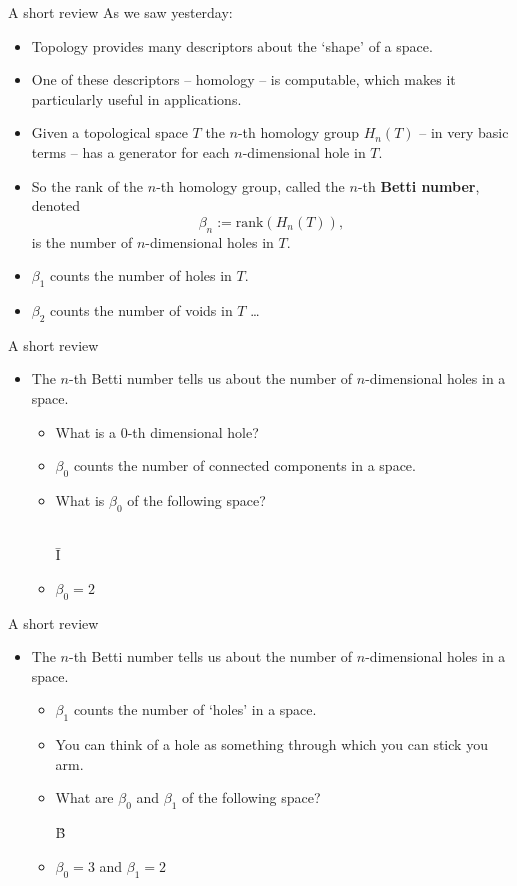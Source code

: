 \begin{frame}{A short review}
As we saw yesterday:
\begin{itemize}
\item<2-> Topology provides many descriptors about the `shape' of a space.
\item<3-> One of these descriptors -- homology -- is computable, which makes it particularly useful in applications.
\item<4-> Given a topological space $T$ the $n$-th homology group $H_n(T)$ -- in very basic terms -- has a generator for each $n$-dimensional hole in $T$. 
\item<5-> So the rank of the $n$-th homology group, called the $n$-th \textbf{Betti number}, denoted
	\[
	\beta_n := \textrm{rank}(H_n(T)),
	\]
is the number of $n$-dimensional holes in $T$.
\item<6-> $\beta_1$ counts the number of holes in $T$.
\item<7-> $\beta_2$ counts the number of voids in $T$ \ldots
\end{itemize}
\end{frame}
\begin{frame}{A short review}
\begin{itemize}
\item The $n$-th Betti number tells us about the number of $n$-dimensional holes in a space.
	\begin{itemize}
	\item<1-> What is a $0$-th dimensional hole?
	\item<2-> $\beta_0$ counts the number of connected components in a space.
	\item<3-> What is $\beta_0$ of the following space?\\
	\
	\begin{center}
	{\fontsize{50pt}{1pt}\selectfont \={I}}
	\end{center}
	\item<4-> $\beta_0 = 2$
	\end{itemize}
\end{itemize}
\end{frame}
\begin{frame}{A short review}
\begin{itemize}
\item The $n$-th Betti number tells us about the number of $n$-dimensional holes in a space.
	\begin{itemize}
	\item<1-> $\beta_1$ counts the number of `holes' in a space.
	\item<2-> You can think of a hole as something through which you can stick you arm.
	\item<3-> What are $\beta_0$ and $\beta_1$ of the following space?
	\begin{center}
	{\fontsize{50pt}{12pt}\selectfont \"{B}}
	\end{center}	
	\item<4-> $\beta_0 = 3$ and $\beta_1 = 2$
	\end{itemize}
\end{itemize}
\end{frame}

